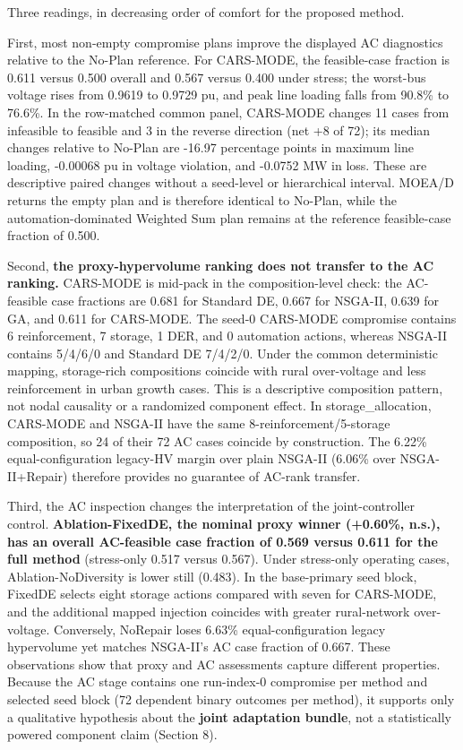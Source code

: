 \documentclass[energies,article,submit,moreauthors]{Definitions/mdpi}
\begin{document}
Three readings, in decreasing order of comfort for the proposed method.

First, most non-empty compromise plans improve the displayed AC diagnostics relative to the No-Plan reference. For CARS-MODE, the feasible-case fraction is 0.611 versus 0.500 overall and 0.567 versus 0.400 under stress; the worst-bus voltage rises from 0.9619 to 0.9729 pu, and peak line loading falls from 90.8\% to 76.6\%. In the row-matched common panel, CARS-MODE changes 11 cases from infeasible to feasible and 3 in the reverse direction (net +8 of 72); its median changes relative to No-Plan are -16.97 percentage points in maximum line loading, -0.00068 pu in voltage violation, and -0.0752 MW in loss. These are descriptive paired changes without a seed-level or hierarchical interval. MOEA/D returns the empty plan and is therefore identical to No-Plan, while the automation-dominated Weighted Sum plan remains at the reference feasible-case fraction of 0.500.

Second, \textbf{the proxy-hypervolume ranking does not transfer to the AC ranking.} CARS-MODE is mid-pack in the composition-level check: the AC-feasible case fractions are 0.681 for Standard DE, 0.667 for NSGA-II, 0.639 for GA, and 0.611 for CARS-MODE. The seed-0 CARS-MODE compromise contains 6 reinforcement, 7 storage, 1 DER, and 0 automation actions, whereas NSGA-II contains 5/4/6/0 and Standard DE 7/4/2/0. Under the common deterministic mapping, storage-rich compositions coincide with rural over-voltage and less reinforcement in urban growth cases. This is a descriptive composition pattern, not nodal causality or a randomized component effect. In storage\_allocation, CARS-MODE and NSGA-II have the same 8-reinforcement/5-storage composition, so 24 of their 72 AC cases coincide by construction. The 6.22\% equal-configuration legacy-HV margin over plain NSGA-II (6.06\% over NSGA-II+Repair) therefore provides no guarantee of AC-rank transfer.

Third, the AC inspection changes the interpretation of the joint-controller control. \textbf{Ablation-FixedDE, the nominal proxy winner (+0.60\%, n.s.), has an overall AC-feasible case fraction of 0.569 versus 0.611 for the full method} (stress-only 0.517 versus 0.567). Under stress-only operating cases, Ablation-NoDiversity is lower still (0.483). In the base-primary seed block, FixedDE selects eight storage actions compared with seven for CARS-MODE, and the additional mapped injection coincides with greater rural-network over-voltage. Conversely, NoRepair loses 6.63\% equal-configuration legacy hypervolume yet matches NSGA-II's AC case fraction of 0.667. These observations show that proxy and AC assessments capture different properties. Because the AC stage contains one run-index-0 compromise per method and selected seed block (72 dependent binary outcomes per method), it supports only a qualitative hypothesis about the \textbf{joint adaptation bundle}, not a statistically powered component claim (Section 8).
\end{document}

